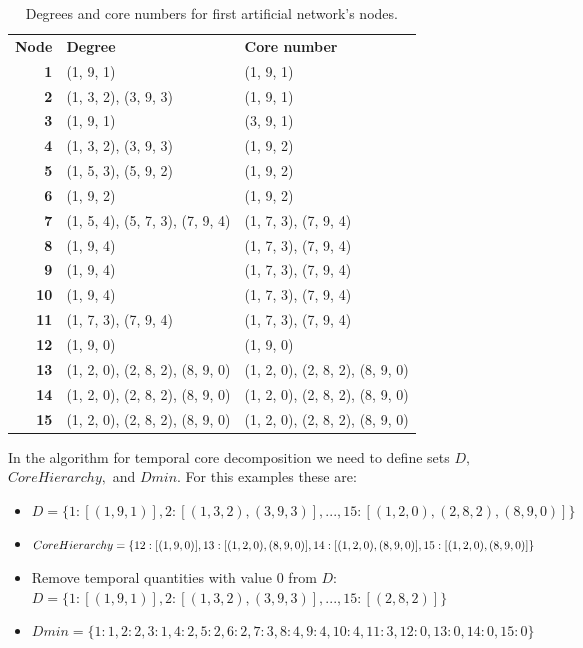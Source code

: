 \documentclass[a4paper,twoside,10pt]{article}
\begin{document}
\begin{table}
\centering
\caption{Degrees and core numbers for first artificial network's nodes.}
\label{artificial1tab}
\begin{tabular}{r|l|l}
\textbf{Node} & \textbf{Degree} & \textbf{Core number} \\
\textbf{1}	&	(1, 9, 1)	&	(1, 9, 1)	\\
\textbf{2}	&	(1, 3, 2), (3, 9, 3)	&	(1, 9, 1)	\\
\textbf{3}	&	(1, 9, 1)	&	(3, 9, 1)	\\
\textbf{4}	&	(1, 3, 2), (3, 9, 3)	&	(1, 9, 2)	\\
\textbf{5}	&	(1, 5, 3), (5, 9, 2)	&	(1, 9, 2)	\\
\textbf{6}	&	(1, 9, 2)	&	(1, 9, 2)	\\
\textbf{7}	&	(1, 5, 4), (5, 7, 3), (7, 9, 4)	&	(1, 7, 3), (7, 9, 4)	\\
\textbf{8}	&	(1, 9, 4)	&	(1, 7, 3), (7, 9, 4)	\\
\textbf{9}	&	(1, 9, 4)	&	(1, 7, 3), (7, 9, 4)	\\
\textbf{10}	&	(1, 9, 4)	&	(1, 7, 3), (7, 9, 4)	\\
\textbf{11}	&	(1, 7, 3), (7, 9, 4)	&	(1, 7, 3), (7, 9, 4)	\\
\textbf{12}	&	(1, 9, 0)	&	(1, 9, 0)	\\
\textbf{13}	&	(1, 2, 0), (2, 8, 2), (8, 9, 0)	&	(1, 2, 0), (2, 8, 2), (8, 9, 0)	\\
\textbf{14}	&	(1, 2, 0), (2, 8, 2), (8, 9, 0)	&	(1, 2, 0), (2, 8, 2), (8, 9, 0)	\\
\textbf{15}	&	(1, 2, 0), (2, 8, 2), (8, 9, 0)	&	(1, 2, 0), (2, 8, 2), (8, 9, 0)
\end{tabular}
\end{table}

In the algorithm for temporal core decomposition we need to define sets $D,$ $CoreHierarchy,$ and $Dmin.$ For this examples these are:
\begin{itemize}
\item $D = \{1: [(1,9,1)], 2: [(1,3,2), (3,9,3)], ..., 15: [(1,2,0), (2,8,2), (8,9,0)]\}$
\item $CoreHierarchy = \{12: [(1,9,0)], 13: [(1,2,0), (8,9,0)], 14: [(1,2,0), \\(8,9,0)], 15: [(1,2,0), (8,9,0)]\}$
\item Remove temporal quantities with value 0 from $D$: $D = \{1: [(1,9,1)], 2: [(1,3,2), (3,9,3)], ..., 15: [(2,8,2)]\}$
\item $Dmin = \{1:1, 2:2, 3:1, 4:2, 5:2, 6:2, 7:3, 8:4, 9:4, 10:4, 11:3, 12:0, 13:0, 14:0, 15:0\}$
\end{itemize}
\end{document}
